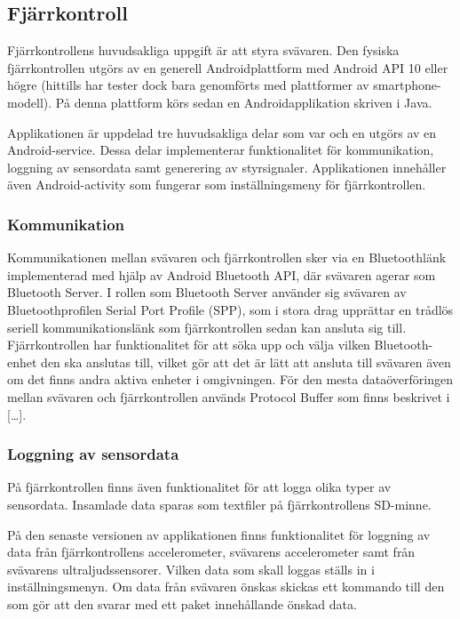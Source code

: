\subsection{Fjärrkontroll}
Fjärrkontrollens huvudsakliga uppgift är att styra svävaren. Den fysiska fjärrkontrollen utgörs av en generell Androidplattform med Android API 10 eller högre (hittills har tester dock bara genomförts med plattformer av smartphone-modell). På denna plattform körs sedan en Androidapplikation skriven i Java. 

Applikationen är uppdelad tre huvudsakliga delar som var och en utgörs av en Android-service. Dessa delar implementerar funktionalitet för kommunikation, loggning av sensordata samt generering av styrsignaler. Applikationen innehåller även Android-activity som fungerar som inställningsmeny för fjärrkontrollen.

\subsubsection{Kommunikation}
Kommunikationen mellan svävaren och fjärrkontrollen sker via en Bluetoothlänk implementerad med hjälp av Android Bluetooth API, där svävaren agerar som Bluetooth Server. I rollen som Bluetooth Server använder sig svävaren av Bluetoothprofilen Serial Port Profile (SPP), som i stora drag upprättar en trådlös seriell kommunikationslänk som fjärrkontrollen sedan kan ansluta sig till. 
Fjärrkontrollen har funktionalitet för att söka upp och välja vilken Bluetooth-enhet den ska anslutas till, vilket gör att det är lätt att ansluta till svävaren även om det finns andra aktiva enheter i omgivningen.
För den mesta dataöverföringen mellan svävaren och fjärrkontrollen används Protocol Buffer som finns beskrivet i […].

\subsubsection{Loggning av sensordata}
På fjärrkontrollen finns även funktionalitet för att logga olika typer av sensordata. Insamlade data sparas som textfiler på fjärrkontrollens SD-minne. 

På den senaste versionen av applikationen finns funktionalitet för loggning av data från fjärrkontrollens accelerometer, svävarens accelerometer samt från svävarens ultraljudssensorer. Vilken data som skall loggas ställs in i inställningsmenyn. Om data från svävaren önskas skickas ett kommando till den som gör att den svarar med ett paket innehållande önskad data. 

